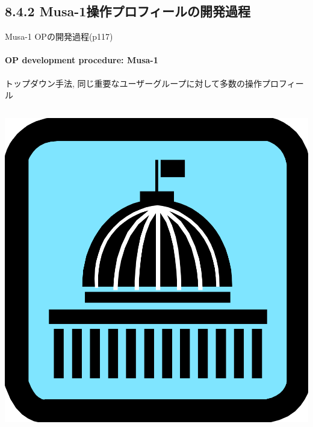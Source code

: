 \subsection{8.4.2 Musa-1操作プロフィールの開発過程}
\begin{frame}{Musa-1 OPの開発過程(p117)}
\framesubtitle{OP development procedure: Musa-1}
\begin{definationfc}[Musa-1]
トップダウン手法, 同じ重要なユーザーグループに対して多数の操作プロフィール
\end{definationfc}

\begin{columns}
\begin{column}{0.1\textwidth}
\begin{center}
\includegraphics[height=\imageheight]{figure/goverment.png}


\end{center}
\end{column}
\end{columns}
\end{frame}
